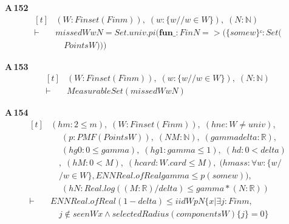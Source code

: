 \noindent\textbf{A\,152}\quad{}
{\footnotesize\[ \begin{aligned}[t]
&(\mathit{W} : \mathit{Finset} (\mathit{Fin} \mathit{m})),\; (\mathit{w} : \{ \mathit{w} // \mathit{w} \in \mathit{W}\} ),\; (\mathit{N} : \mathbb{N} )\\
\vdash\;&\mathit{missed} \mathit{W} \mathit{w} \mathit{N} = \mathit{Set}.\mathit{univ}.\mathit{pi} (\mathbf{fun} \mathit{\_} : \mathit{Fin} \mathit{N} => (\{ \mathit{some} \mathit{w}\} ᶜ : \mathit{Set} (\\
&\quad \mathit{Points} \mathit{W})))
\end{aligned} \]}

\noindent\textbf{A\,153}\quad{}
{\footnotesize\[ \begin{aligned}[t]
&(\mathit{W} : \mathit{Finset} (\mathit{Fin} \mathit{m})),\; (\mathit{w} : \{ \mathit{w} // \mathit{w} \in \mathit{W}\} ),\; (\mathit{N} : \mathbb{N} )\\
\vdash\;&\mathit{MeasurableSet} (\mathit{missed} \mathit{W} \mathit{w} \mathit{N})
\end{aligned} \]}

\noindent\textbf{A\,154}\quad{}
{\footnotesize\[ \begin{aligned}[t]
&(\mathit{hm} : 2 \leq \mathit{m}),\; (\mathit{W} : \mathit{Finset} (\mathit{Fin} \mathit{m})),\; (\mathit{hne} : \mathit{W} \neq \mathit{univ}),\\
&\quad \; (\mathit{p} : \mathit{PMF} (\mathit{Points} \mathit{W})),\; (\mathit{N} \mathit{M} : \mathbb{N} ),\; (\mathit{gamma} \mathit{delta} : \mathbb{R} ),\\
&\quad \; (\mathit{hg0} : 0 \leq \mathit{gamma}),\; (\mathit{hg1} : \mathit{gamma} \leq 1),\; (\mathit{hd} : 0 < \mathit{delta})\\
&\quad ,\; (\mathit{hM} : 0 < \mathit{M}),\; (\mathit{hcard} : \mathit{W}.\mathit{card} \leq \mathit{M}),\; (\mathit{hmass} : \forall \mathit{w} : \{ \mathit{w} /\\
&\quad / \mathit{w} \in \mathit{W}\} , \mathit{ENNReal}.\mathit{ofReal} \mathit{gamma} \leq \mathit{p} (\mathit{some} \mathit{w})),\\
&\quad \; (\mathit{hN} : \mathit{Real}.\mathit{log} ((\mathit{M}:\mathbb{R} )/\mathit{delta}) \leq \mathit{gamma}*(\mathit{N}:\mathbb{R} ))\\
\vdash\;&\mathit{ENNReal}.\mathit{ofReal} (1-\mathit{delta}) \leq \mathit{iid} \mathit{W} \mathit{p} \mathit{N} \{ \mathit{x} | \exists \mathit{j} : \mathit{Fin} \mathit{m},\\
&\quad \mathit{j} \notin \mathit{seen} \mathit{W} \mathit{x} \wedge \mathit{selectedRadius} (\mathit{components} \mathit{W}) \{ \mathit{j}\} = 0\}
\end{aligned} \]}

